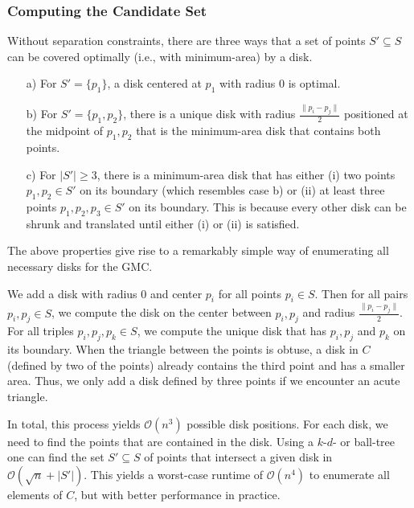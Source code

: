 \documentclass[letterpaper, 10 pt, conference]{ieeeconf}
\newcommand{\bigO}{\mathcal{O}} %
\newcommand{\points}{S}
\newcommand{\point}{p}
\begin{document}
\subsubsection{Computing the Candidate Set}
\label{section:candidate-disks}
Without separation constraints, there are three ways that a set of points $\points'\subseteq \points$ can be covered optimally (i.e., with minimum-area) by a disk.
\begin{enumerate}
    \item[a)] For $\points'=\{\point_1\}$, a disk centered at $\point_1$ with radius $0$ is optimal.
    \item[b)] For $\points'=\{\point_1,\point_2\}$, there is a unique disk with radius $\frac{\lVert \point_i- \point_j \rVert}{2}$ positioned at the midpoint of $\point_1, \point_2$ that is the minimum-area disk that contains both points.
    \item[c)] For $|\points'|\geq 3$, there is a minimum-area disk that has either (i) two points $\point_1, \point_2\in \points'$ on its boundary (which resembles case b) or (ii) at least three points $\point_1,\point_2,\point_3\in \points'$ on its boundary.
        This is because every other disk can be shrunk and translated until either (i) or (ii) is satisfied.
\end{enumerate}

The above properties give rise to a remarkably simple way of enumerating all necessary disks for the GMC.

We add a disk with radius $0$ and center $\point_i$ for all points $\point_i\in \points$.
Then for all pairs $\point_i, \point_j\in \points$, we compute the disk on the center between $\point_i,\point_j$ and radius $\frac{\lVert \point_i- \point_j \rVert}{2}$.
For all triples $\point_i, \point_j, \point_k\in \points$, we compute the unique disk that has $\point_i, \point_j$ and $\point_k$ on its boundary.
When the triangle between the points is obtuse, a disk in $C$ (defined by two of the points) already contains the third point and has a smaller area.
Thus, we only add a disk defined by three points if we encounter an acute triangle.

In total, this process yields $\bigO(n^3)$ possible disk positions.
For each disk, we need to find the points that are contained in the disk.
Using a $k$-$d$- or ball-tree one can find the set $\points'\subseteq \points$ of points that intersect a given disk in $\bigO(\sqrt{n}+|\points'|)$.
This yields a worst-case runtime of $\bigO(n^4)$ to enumerate all elements of $C$, but with better performance in practice.
\end{document}
